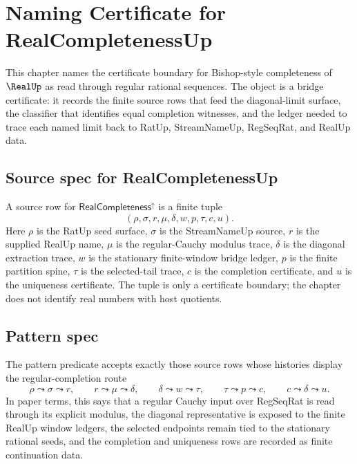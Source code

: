 \providecommand{\RealCompletenessUp}{\ensuremath{\mathsf{RealCompleteness}^{\uparrow}}}

\chapter{Naming Certificate for RealCompletenessUp}
\label{ch:concrete-instances-real-completeness}

This chapter names the certificate boundary for Bishop-style completeness of $\RealUp$ as read through regular rational sequences. The object is a bridge certificate: it records the finite source rows that feed the diagonal-limit surface, the classifier that identifies equal completion witnesses, and the ledger needed to trace each named limit back to RatUp, StreamNameUp, RegSeqRat, and RealUp data.

\section{Source spec for RealCompletenessUp}
\label{sec:concrete-instances-real-completeness-source-spec}

\begin{definition}
\label{def:concrete-instances-real-completeness-source-rows}
A source row for $\RealCompletenessUp$ is a finite tuple
$$
(\rho,\sigma,r,\mu,\delta,w,p,\tau,c,u).
$$
Here $\rho$ is the RatUp seed surface, $\sigma$ is the StreamNameUp source, $r$ is the supplied RealUp name, $\mu$ is the regular-Cauchy modulus trace, $\delta$ is the diagonal extraction trace, $w$ is the stationary finite-window bridge ledger, $p$ is the finite partition spine, $\tau$ is the selected-tail trace, $c$ is the completion certificate, and $u$ is the uniqueness certificate. The tuple is only a certificate boundary; the chapter does not identify real numbers with host quotients.
\end{definition}

\section{Pattern spec}
\label{sec:concrete-instances-real-completeness-pattern}

\begin{definition}
\label{def:concrete-instances-real-completeness-pattern}
The pattern predicate accepts exactly those source rows whose histories display the regular-completion route
$$
\rho \leadsto \sigma \leadsto r,\qquad
r \leadsto \mu \leadsto \delta,\qquad
\delta \leadsto w \leadsto \tau,\qquad
\tau \leadsto p \leadsto c,\qquad
c \leadsto \delta \leadsto u.
$$
In paper terms, this says that a regular Cauchy input over RegSeqRat is read through its explicit modulus, the diagonal representative is exposed to the finite RealUp window ledgers, the selected endpoints remain tied to the stationary rational seeds, and the completion and uniqueness rows are recorded as finite continuation data.
\end{definition}


